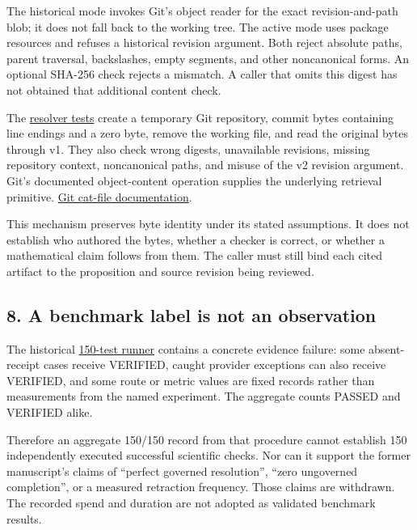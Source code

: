 \documentclass[
  11pt,
]{article}
\begin{document}
The historical mode invokes Git's object reader for the exact
revision-and-path blob; it does not fall back to the working tree. The
active mode uses package resources and refuses a historical revision
argument. Both reject absolute paths, parent traversal, backslashes,
empty segments, and other noncanonical forms. An optional SHA-256 check
rejects a mismatch. A caller that omits this digest has not obtained
that additional content check.

The
\href{https://github.com/dbccpage/the_symbol_game/blob/52cb5457f6c485ba548cfd292f6012a941ed22cf/omega_engine_operations/tests/level_engine/test_evidence_resolver.py}{resolver
tests} create a temporary Git repository, commit bytes containing line
endings and a zero byte, remove the working file, and read the original
bytes through v1. They also check wrong digests, unavailable revisions,
missing repository context, noncanonical paths, and misuse of the v2
revision argument. Git's documented object-content operation supplies
the underlying retrieval primitive.
\href{https://git-scm.com/docs/git-cat-file}{Git cat-file
documentation}.

This mechanism preserves byte identity under its stated assumptions. It
does not establish who authored the bytes, whether a checker is correct,
or whether a mathematical claim follows from them. The caller must still
bind each cited artifact to the proposition and source revision being
reviewed.

\hypertarget{a-benchmark-label-is-not-an-observation}{%
\subsection{8. A benchmark label is not an
observation}\label{a-benchmark-label-is-not-an-observation}}

The historical
\href{https://github.com/dbccpage/the_symbol_game/blob/52cb5457f6c485ba548cfd292f6012a941ed22cf/omega_engine_projects/mssn_sn_symgam/challenges/run_150_tests_suite.py}{150-test
runner} contains a concrete evidence failure: some absent-receipt cases
receive VERIFIED, caught provider exceptions can also receive VERIFIED,
and some route or metric values are fixed records rather than
measurements from the named experiment. The aggregate counts PASSED and
VERIFIED alike.

Therefore an aggregate 150/150 record from that procedure cannot
establish 150 independently executed successful scientific checks. Nor
can it support the former manuscript's claims of ``perfect governed
resolution'', ``zero ungoverned completion'', or a measured retraction
frequency. Those claims are withdrawn. The recorded spend and duration
are not adopted as validated benchmark results.
\end{document}

